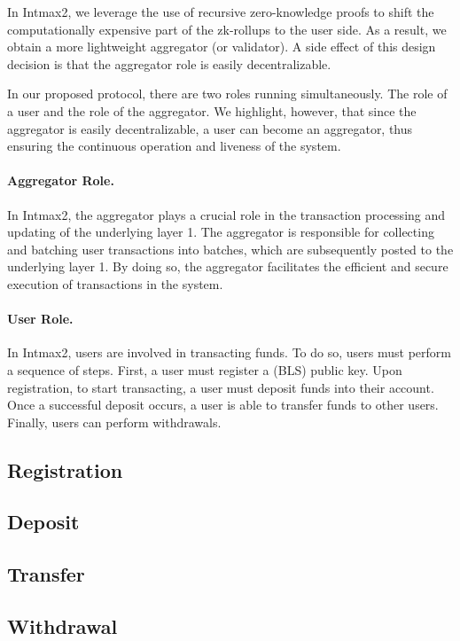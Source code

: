 
In Intmax2, we leverage the use of recursive zero-knowledge proofs to shift the computationally expensive part of the zk-rollups to the user side. As a result, we obtain a more lightweight aggregator (or validator). A side effect of this design decision is that the aggregator role is easily decentralizable. 

In our proposed protocol, there are two roles running simultaneously. The role of a user and the role of the aggregator. We highlight, however, that since the aggregator is easily decentralizable, a user can become an aggregator, thus ensuring the continuous operation and liveness of the system.

\paragraph{Aggregator Role.}
In Intmax2, the aggregator plays a crucial role in the transaction processing and updating of the underlying layer 1. The aggregator is responsible for collecting and batching user transactions into batches, which are subsequently posted to the underlying layer 1. By doing so, the aggregator facilitates the efficient and secure execution of transactions in the system.

\paragraph{User Role.}
In Intmax2, users are involved in transacting funds. To do so, users must perform a sequence of steps. First, a user must register a (BLS) public key. Upon registration, to start transacting, a user must deposit funds into their account. Once a successful deposit occurs, a user is able to transfer funds to other users. Finally, users can perform withdrawals. 

\subsection{Registration}
    

\subsection{Deposit}
    

\clearpage
\subsection{Transfer}
    

\subsection{Withdrawal}
    

    